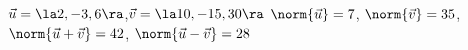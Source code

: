 {$\vec u=\la 2,-3,6\ra$,\quad $\vec v = \la 10,-15,30\ra$
}
{$\norm{\vec u} = 7$, $\norm{\vec v} = 35$, $\norm{\vec u+\vec v} = 42$, $\norm{\vec u-\vec v} = 28$
}

